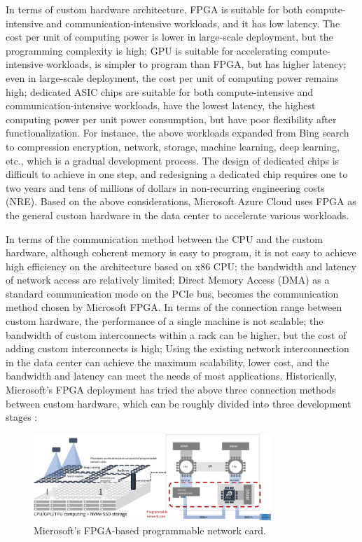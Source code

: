 In terms of custom hardware architecture, FPGA is suitable for both compute-intensive and communication-intensive workloads, and it has low latency. The cost per unit of computing power is lower in large-scale deployment, but the programming complexity is high; GPU is suitable for accelerating compute-intensive workloads, is simpler to program than FPGA, but has higher latency; even in large-scale deployment, the cost per unit of computing power remains high; dedicated ASIC chips are suitable for both compute-intensive and communication-intensive workloads, have the lowest latency, the highest computing power per unit power consumption, but have poor flexibility after functionalization. For instance, the above workloads expanded from Bing search to compression encryption, network, storage, machine learning, deep learning, etc., which is a gradual development process. The design of dedicated chips is difficult to achieve in one step, and redesigning a dedicated chip requires one to two years and tens of millions of dollars in non-recurring engineering costs (NRE).
Based on the above considerations, Microsoft Azure Cloud uses FPGA as the general custom hardware in the data center to accelerate various workloads.

In terms of the communication method between the CPU and the custom hardware, although coherent memory is easy to program, it is not easy to achieve high efficiency on the architecture based on x86 CPU; the bandwidth and latency of network access are relatively limited; Direct Memory Access (DMA) as a standard communication mode on the PCIe bus, becomes the communication method chosen by Microsoft FPGA.
In terms of the connection range between custom hardware, the performance of a single machine is not scalable; the bandwidth of custom interconnects within a rack can be higher, but the cost of adding custom interconnects is high;
Using the existing network interconnection in the data center can achieve the maximum scalability, lower cost, and the bandwidth and latency can meet the needs of most applications.
Historically, Microsoft's FPGA deployment has tried the above three connection methods between custom hardware, which can be roughly divided into three development stages \cite{configurable-cloud-acceleration}:

\begin{figure}[htbp]
	\centering
	\includegraphics[width=0.8\textwidth]{figures/azure_fpga.pdf}
	\caption{Microsoft's FPGA-based programmable network card.}
	\label{background:fig:azure_fpga}
\end{figure}

